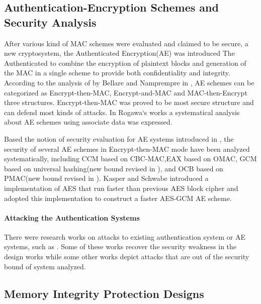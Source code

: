 \documentclass{article}
\begin{document}
\subsection{Authentication-Encryption Schemes and Security Analysis}
After various kind of MAC schemes were evaluated and claimed to be secure, a new cryptosystem, the Authenticated Encryption(AE) was introduced The Authenticated to combine the encryption of
plaintext blocks and generation of the MAC in a single scheme to provide both
confidentiality and integrity. According to the analysis of by Bellare and Namprempre in \cite{ae-notion}, AE schemes can be categorized as Encrypt-then-MAC, Encrypt-and-MAC and MAC-then-Encrypt three structures. Encrypt-then-MAC was proved to be most secure structure and can defend most kinds of attacks. 
In Rogawa`s works \cite{aead} a systematical analysis about AE
schemes using associate data was expressed.  

Based the notion of security evaluation for AE systems introduced in \cite{aead}, the security of several AE schemes in
Encrypt-then-MAC mode have been analyzed systematically, including CCM \cite{ccm}based on
CBC-MAC,EAX\cite{eax} based on OMAC, GCM
\cite{gcm} based on universal hashing(new bound revised in \cite{breaking}), and
OCB\cite{ocb} based on PMAC(new bound revised in \cite{tweak,iPMAC}). Kasper and
Schwabe introduced a implementation of AES that run faster than previous AES block cipher
and adopted this implementation to construct a faster AES-GCM AE
scheme\cite{fast}.
\paragraph{Attacking the Authentication Systems}
There were research works on attacks to existing authentication system or AE systems, such as
\cite{cycle,attack_blk,hardware_attack}. Some of these works recover the security weakness in the design works while some other works depict attacks that are out of the security bound of system analyzed. 

\subsection{Memory Integrity Protection Designs}
\end{document}
